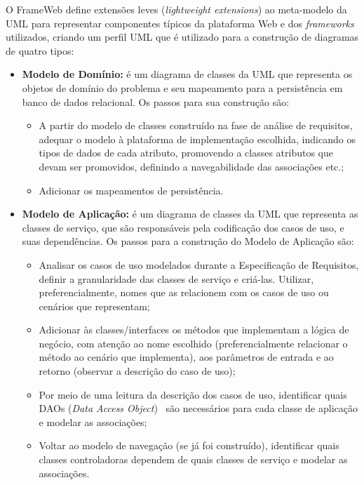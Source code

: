 O FrameWeb define extensões leves (\textit{lightweight extensions}) ao meta-modelo da UML para representar componentes típicos da plataforma Web e dos \textit{frameworks} utilizados, criando um perfil UML que é utilizado para a construção de diagramas de quatro tipos:

\begin{itemize}
	\item \textbf{Modelo de Domínio:} é um diagrama de classes da UML que representa os objetos de domínio do problema e seu mapeamento para a persistência em banco de dados relacional. Os passos para sua construção são:
	
	\begin{itemize}
		\item A partir do modelo de classes construído na fase de análise de requisitos, adequar o modelo à plataforma de implementação escolhida, indicando os tipos de dados de cada atributo, promovendo a classes atributos que devam ser promovidos, definindo a navegabilidade das associações etc.;
		\item Adicionar os mapeamentos de persistência.	
	
	\end{itemize}
	
	\item \textbf{Modelo de Aplicação:} é um diagrama de classes da UML que representa as classes de serviço, que são responsáveis pela codificação dos casos de uso, e suas dependências. Os passos para a construção do Modelo de Aplicação são:	
	\begin{itemize}
		\item Analisar os casos de uso modelados durante a Especificação de Requisitos, definir a granularidade das classes de serviço e criá-las. Utilizar, preferencialmente, nomes que as relacionem com os casos de uso ou cenários que representam;
	
		\item Adicionar às classes/interfaces os métodos que implementam a lógica de negócio, com atenção ao nome escolhido (preferencialmente relacionar o método ao cenário que implementa), aos parâmetros de entrada e ao retorno (observar a descrição do caso de uso);
	
		\item Por meio de uma leitura da descrição dos casos de uso, identificar quais DAOs (\textit{Data Access Object})~\cite{alurDAO} são necessários para cada classe de aplicação e modelar as associações;
	
		\item Voltar ao modelo de navegação (se já foi construído), identificar quais classes controladoras dependem de quais classes de serviço e modelar as associações.
	\end{itemize}
	

\end{itemize}
